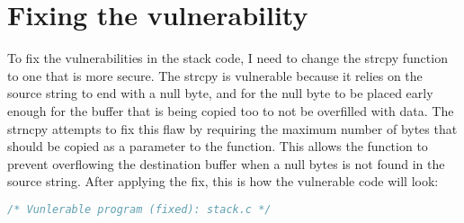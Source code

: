 \documentclass[14pt]{extarticle}
\begin{document}
\section{Fixing the vulnerability}
To fix the vulnerabilities in the stack code, I need to change the strcpy function to one that is more secure. The strcpy is vulnerable because it relies on the source string to end with a null byte, and for the null byte to be placed early enough for the buffer that is being copied too to not be overfilled with data. The strncpy attempts to fix this flaw by requiring the maximum number of bytes that should be copied as a parameter to the function. This allows the function to prevent overflowing the destination buffer when a null bytes is not found in the source string. 
After applying the fix, this is how the vulnerable code will look:
\begin{lstlisting}[language=c]
/* Vunlerable program (fixed): stack.c */


\end{lstlisting}
\end{document}
